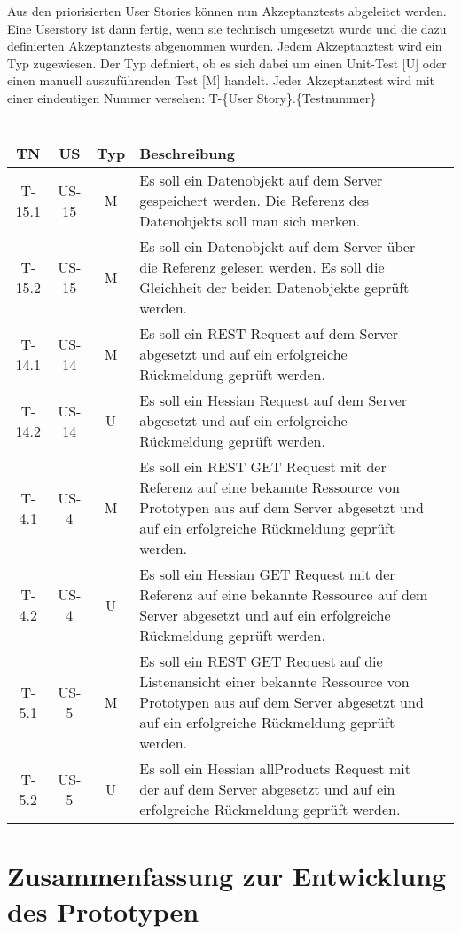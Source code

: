 \documentclass[listof=totocnumbered, bibliography=totocnumbered]{scrreprt}
\begin{document}
  Aus den priorisierten User Stories können nun Akzeptanztests abgeleitet
  werden. Eine Userstory ist dann fertig, wenn sie technisch umgesetzt wurde und
  die dazu definierten Akzeptanztests abgenommen wurden. Jedem
  Akzeptanztest wird ein Typ zugewiesen. Der Typ definiert, ob es sich
  dabei um einen Unit-Test [U] oder einen manuell auszuführenden Test [M]
  handelt. Jeder Akzeptanztest wird mit einer eindeutigen Nummer versehen: T-\{User Story\}.\{Testnummer\}\\
  \\
  \begin{tabular}{cccp{11.3cm}l}
    \toprule
    TN & US & Typ & Beschreibung \\
    \midrule
    T-15.1 & US-15 & M & Es soll ein Datenobjekt auf dem Server gespeichert
    werden. Die Referenz des Datenobjekts soll man sich merken.\\
    T-15.2 & US-15 & M & Es soll ein Datenobjekt auf dem Server über
    die Referenz gelesen werden. Es soll die Gleichheit der beiden Datenobjekte
    geprüft werden.\\
    T-14.1 & US-14 & M & Es soll ein \ac{REST} Request auf dem Server abgesetzt
    und auf ein erfolgreiche Rückmeldung geprüft werden.\\
    T-14.2 & US-14 & U & Es soll ein Hessian Request auf dem Server abgesetzt
    und auf ein erfolgreiche Rückmeldung geprüft werden.\\
    T-4.1 & US-4 & M & Es soll ein \ac{REST} GET Request mit der Referenz auf
    eine bekannte Ressource von Prototypen aus auf dem Server abgesetzt und auf
    ein erfolgreiche Rückmeldung geprüft werden.\\
    T-4.2 & US-4 & U & Es soll ein Hessian GET Request mit der Referenz auf
    eine bekannte Ressource auf dem Server abgesetzt und auf ein erfolgreiche
    Rückmeldung geprüft werden.\\
    T-5.1 & US-5 & M & Es soll ein \ac{REST} GET Request auf die
    Listenansicht einer bekannte Ressource von Prototypen aus auf dem Server
    abgesetzt und auf ein erfolgreiche Rückmeldung geprüft werden.\\
    T-5.2 & US-5 & U & Es soll ein Hessian allProducts Request mit der auf dem
    Server abgesetzt und auf ein erfolgreiche Rückmeldung geprüft werden.\\
    \bottomrule
  \end{tabular}
  
  \newpage
  
  \section{Zusammenfassung zur Entwicklung des Prototypen}
  
\end{document}
